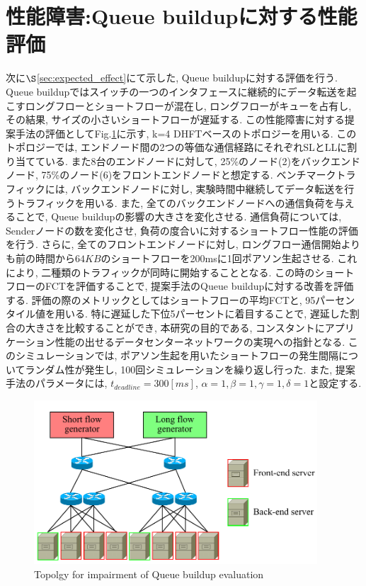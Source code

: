 \section{性能障害:Queue buildupに対する性能評価}
次に$\S$\ref{sec:expected_effect}にて示した, Queue buildupに対する評価を行う. 
Queue buildupではスイッチの一つのインタフェースに継続的にデータ転送を起こすロングフローとショートフローが混在し, ロングフローがキューを占有し,
その結果, サイズの小さいショートフローが遅延する. 
この性能障害に対する提案手法の評価としてFig.\ref{fig:eval2_topo}に示す, k=4 DHFTベースのトポロジーを用いる. 
このトポロジーでは, エンドノード間の2つの等価な通信経路にそれぞれSLとLLに割り当てている.
また8台のエンドノードに対して, 25\%のノード(2)をバックエンドノード, 75\%のノード(6)をフロントエンドノードと想定する. 
ベンチマークトラフィックには, バックエンドノードに対し, 実験時間中継続してデータ転送を行うトラフィックを用いる.
また, 全てのバックエンドノードへの通信負荷を与えることで, Queue buildupの影響の大きさを変化させる. 
通信負荷については, Senderノードの数を変化させ, 負荷の度合いに対するショートフロー性能の評価を行う. 
さらに, 全てのフロントエンドノードに対し, ロングフロー通信開始よりも前の時間から$64KB$のショートフローを200msに1回ポアソン生起させる. 
これにより, 二種類のトラフィックが同時に開始することとなる. 
この時のショートフローのFCTを評価することで, 提案手法のQueue buildupに対する改善を評価する. 
評価の際のメトリックとしてはショートフローの平均FCTと, 95パーセンタイル値を用いる. 
特に遅延した下位5パーセントに着目することで, 遅延した割合の大きさを比較することができ, 
本研究の目的である, コンスタントにアプリケーション性能の出せるデータセンターネットワークの実現への指針となる.
このシミュレーションでは, ポアソン生起を用いたショートフローの発生間隔についてランダム性が発生し, 100回シミュレーションを繰り返し行った. 
また, 提案手法のパラメータには, $t_{deadline}=300[ms]$, $\alpha=1, \beta=1, \gamma=1, \delta=1$と設定する.

\begin{figure}[t]
    \begin{center}
    \includegraphics[autoebb, width=300pt]{./img/evalu2.pdf}
    \caption{Topolgy for impairment of Queue buildup evaluation}
    \label{fig:eval2_topo}
    \end{center}
\end{figure}

